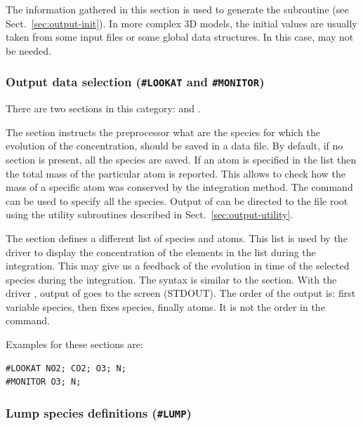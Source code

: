 \documentclass[twoside]{article}
\newcommand{\kpproot}{{\sc root}}
\begin{document}
The information gathered in this section is used to generate the
 subroutine (see Sect.~\ref{sec:output-init}). In more
complex 3D models, the initial values are usually taken from some input
files or some global data structures. In this case, 
may not be needed.

\subsubsection{Output data selection ({\tt\#LOOKAT} and {\tt\#MONITOR})}
\label{sec:section-lookat-monitor}

There are two sections in this category:  and
.

The  section instructs the preprocessor what are the
species for which the evolution of the concentration, should be saved in
a data file. By default, if no  section is present, all
the species are saved. If an atom is specified in the 
list then the total mass of the particular atom is reported. This allows
to check how the mass of a specific atom was conserved by the
integration method. The  command can be used to specify
all the species. Output of  can be directed to the file
\kpproot{} using the utility subroutines described in
Sect.~\ref{sec:output-utility}.

The  section defines a different list of species and
atoms. This list is used by the driver to display the concentration of
the elements in the list during the integration. This may give us a
feedback of the evolution in time of the selected species during the
integration. The syntax is similar to the  section. With
the driver , output of  goes to the screen
(STDOUT). The order of the output is: first variable species, then fixes
species, finally atoms. It is not the order in the 
command.

Examples for these sections are:
%
\begin{verbatim}
#LOOKAT NO2; CO2; O3; N;
#MONITOR O3; N;
\end{verbatim}

\subsubsection{Lump species definitions ({\tt\#LUMP})}
\label{sec:section-lump}
\end{document}
